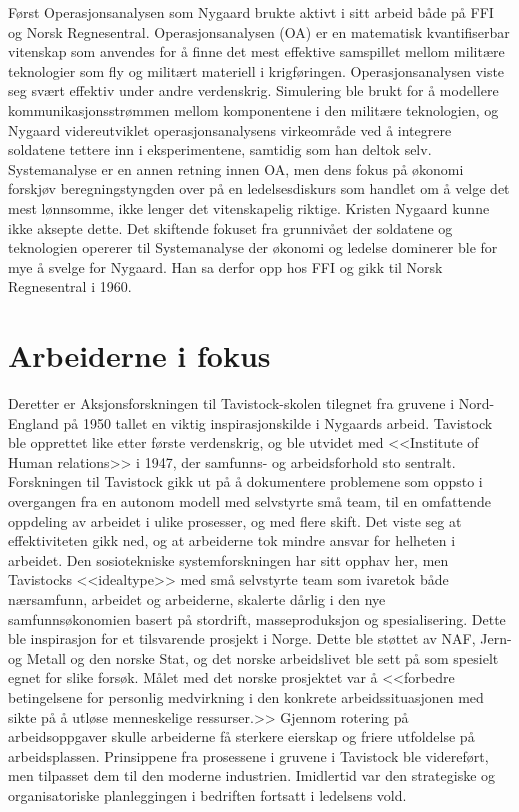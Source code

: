 Først Operasjonsanalysen som Nygaard brukte aktivt i sitt arbeid både på FFI og Norsk Regnesentral. Operasjonsanalysen (OA) er en matematisk kvantifiserbar vitenskap som anvendes for å finne det mest effektive samspillet mellom militære teknologier som fly og militært materiell i krigføringen. Operasjonsanalysen viste seg svært effektiv under andre verdenskrig. Simulering ble brukt for å modellere kommunikasjonsstrømmen mellom komponentene i den militære teknologien, og Nygaard videreutviklet operasjonsanalysens virkeområde ved å integrere soldatene tettere inn i eksperimentene, samtidig som han deltok selv. Systemanalyse er en annen retning innen OA, men dens fokus på økonomi forskjøv beregningstyngden over på en ledelsesdiskurs som handlet om å velge det mest lønnsomme, ikke lenger det vitenskapelig riktige. Kristen Nygaard kunne ikke aksepte dette. Det skiftende fokuset fra grunnivået der soldatene og teknologien opererer til Systemanalyse der økonomi og ledelse dominerer ble for mye å svelge for Nygaard. Han sa derfor opp hos FFI og gikk til Norsk Regnesentral i 1960.

\section{Arbeiderne i fokus}

Deretter er Aksjonsforskningen til Tavistock-skolen tilegnet fra gruvene i Nord-England på 1950 tallet en viktig inspirasjonskilde i Nygaards arbeid. Tavistock ble opprettet like etter første verdenskrig, og ble utvidet med <<Institute of Human relations>> i 1947, der samfunns- og arbeidsforhold sto sentralt. Forskningen til Tavistock gikk ut på å dokumentere problemene som oppsto i overgangen fra en autonom modell med selvstyrte små team, til en omfattende oppdeling av arbeidet i ulike prosesser, og med flere skift. Det viste seg at effektiviteten gikk ned, og at arbeiderne tok mindre ansvar for helheten i arbeidet. Den sosiotekniske systemforskningen har sitt opphav her, men Tavistocks <<idealtype>> med små selvstyrte team som ivaretok både nærsamfunn, arbeidet og arbeiderne, skalerte dårlig i den nye samfunnsøkonomien basert på stordrift, masseproduksjon og spesialisering. Dette ble inspirasjon for et tilsvarende prosjekt i Norge. Dette ble støttet av NAF, Jern- og Metall og den norske Stat, og det norske arbeidslivet ble sett på som spesielt egnet for slike forsøk. Målet med det norske prosjektet var å <<forbedre betingelsene for personlig medvirkning i den konkrete arbeidssituasjonen med sikte på å utløse menneskelige ressurser.>> Gjennom rotering på arbeidsoppgaver skulle arbeiderne få sterkere eierskap og friere utfoldelse på arbeidsplassen. Prinsippene fra prosessene i gruvene i Tavistock ble videreført, men tilpasset dem til den moderne industrien. Imidlertid var den strategiske og organisatoriske planleggingen i bedriften fortsatt i ledelsens vold.

